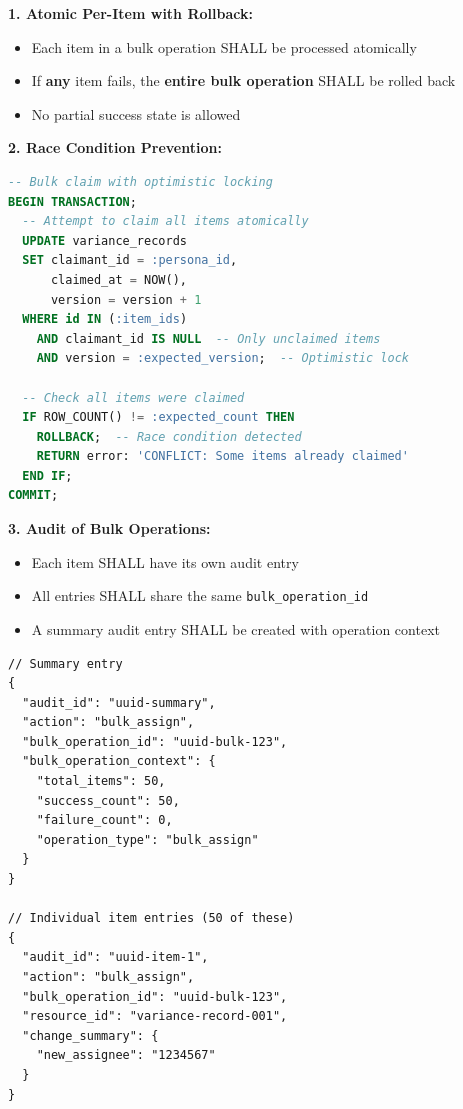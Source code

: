 \begin{tcolorbox}[colback=green!5,colframe=green!70,title=\faIcon{check-circle} Resolution: Bulk Operation Semantics]

\textbf{1. Atomic Per-Item with Rollback:}
\begin{itemize}
    \item Each item in a bulk operation SHALL be processed atomically
    \item If \textbf{any} item fails, the \textbf{entire bulk operation} SHALL be rolled back
    \item No partial success state is allowed
\end{itemize}

\textbf{2. Race Condition Prevention:}
\begin{lstlisting}[language=SQL,caption={Optimistic Locking for Bulk Claim}]
-- Bulk claim with optimistic locking
BEGIN TRANSACTION;
  -- Attempt to claim all items atomically
  UPDATE variance_records 
  SET claimant_id = :persona_id,
      claimed_at = NOW(),
      version = version + 1
  WHERE id IN (:item_ids)
    AND claimant_id IS NULL  -- Only unclaimed items
    AND version = :expected_version;  -- Optimistic lock
  
  -- Check all items were claimed
  IF ROW_COUNT() != :expected_count THEN
    ROLLBACK;  -- Race condition detected
    RETURN error: 'CONFLICT: Some items already claimed'
  END IF;
COMMIT;
\end{lstlisting}

\textbf{3. Audit of Bulk Operations:}
\begin{itemize}
    \item Each item SHALL have its own audit entry
    \item All entries SHALL share the same \texttt{bulk\_operation\_id}
    \item A summary audit entry SHALL be created with operation context
\end{itemize}

\begin{lstlisting}[language=jsonx,caption={Bulk Operation Audit Example}]
// Summary entry
{
  "audit_id": "uuid-summary",
  "action": "bulk_assign",
  "bulk_operation_id": "uuid-bulk-123",
  "bulk_operation_context": {
    "total_items": 50,
    "success_count": 50,
    "failure_count": 0,
    "operation_type": "bulk_assign"
  }
}

// Individual item entries (50 of these)
{
  "audit_id": "uuid-item-1",
  "action": "bulk_assign",
  "bulk_operation_id": "uuid-bulk-123",
  "resource_id": "variance-record-001",
  "change_summary": {
    "new_assignee": "1234567"
  }
}
\end{lstlisting}
\end{tcolorbox}

